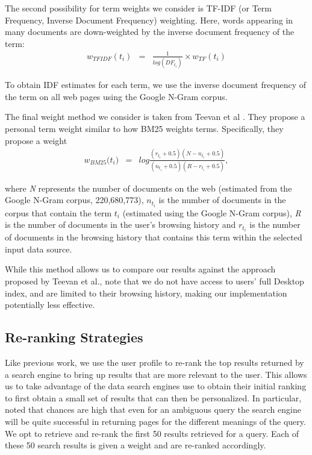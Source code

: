 \documentclass{sig-alternate}
\begin{document}
The second possibility for term weights we consider is TF-IDF (or Term Frequency, Inverse Document Frequency) weighting. Here, words appearing in many documents are down-weighted by the inverse document frequency of the term:
\begin{eqnarray}
w{_{TFIDF}}(t{_{i}}) & = & \frac{1}{log(DF{_{t{_{i}}}})} \times w{_{TF}}(t{_{i}})
\end{eqnarray}

To obtain IDF estimates for each term, we use the inverse document frequency of the term on all web pages using the Google N-Gram corpus.

\vspace{3mm}

The final weight method we consider is taken from Teevan et al \cite{Teevan:Main}. They propose a personal term weight similar to how BM25 weights terms. Specifically, they propose a weight
\begin{eqnarray}
w{_{BM25}(t{_{i}}}) & = & log\frac{(r{_{t{_{i}}}}+0.5)(N-n{_{t{_{i}}}}+0.5)}{(n{_{t{_{i}}}} + 0.5)(R-r{_{t{_{i}}}}+0.5)}, 
\end{eqnarray}

where \emph{N} represents the number of documents on the web (estimated from the Google N-Gram corpus, 220,680,773), $n{_{t_i}}$ is the number of documents in the corpus that contain the term $t_i$ (estimated using the Google N-Gram corpus), \emph{R} is the number of documents in the user's browsing history and $r_{t_i}$ is the number of documents in the browsing history that contains this term within the selected input data source. 

While this method allows us to compare our results against the approach proposed by Teevan et al., note that we do not have access to users' full Desktop index, and are limited to their browsing history, making our implementation potentially less effective.

\subsection{Re-ranking Strategies}

Like previous work, we use the user profile to re-rank the top results returned by a search engine to bring up results that are more relevant to the user. This allows us to take advantage of the data search engines use to obtain their initial ranking to first obtain a small set of results that can then be personalized. In particular, \cite{Teevan:Main} noted that chances are high that even for an ambiguous query the search engine will be quite successful in returning pages for the different meanings of the query. We opt to retrieve and re-rank the first 50 results retrieved for a query. Each of these 50 search results is given a weight and are re-ranked accordingly. 
\end{document}
